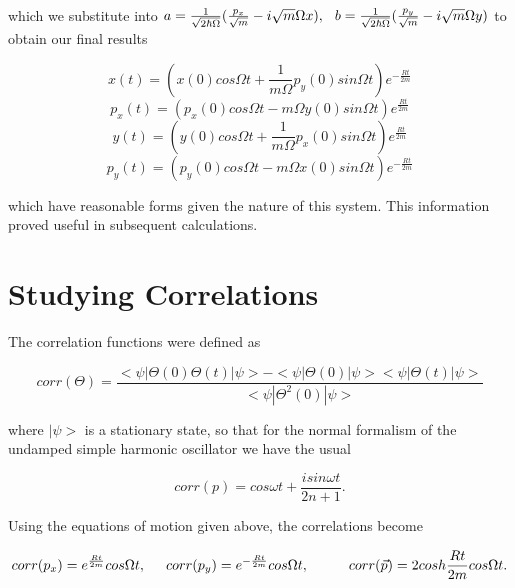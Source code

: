 which we substitute into $a = \frac{1}{\sqrt{2 \hbar \Omega}} (\frac{p_{x}}
{\sqrt{m}} - i \sqrt{m} \Omega x), \hspace{.25cm} b =  \frac{1}{\sqrt{2 \hbar
\Omega}} (\frac{p_{y}}{\sqrt{m}} - i \sqrt{m} \Omega y)$ to obtain our 
final results

\begin{equation}
x(t) = (x(0) cos\Omega t + \frac{1}{m \Omega} p_{y}(0) sin\Omega t)
        e^{- \frac{R t}{2 m}}
\end{equation}
\begin{equation}
p_{x}(t) = (p_{x}(0) cos\Omega t - m \Omega y(0) sin\Omega t)
        e^{\frac{R t}{2 m}}
\end{equation}
\begin{equation}
y(t) = (y(0) cos\Omega t + \frac{1}{m \Omega} p_{x}(0) sin\Omega t)
        e^{\frac{R t}{2 m}}
\end{equation}
\begin{equation}
p_{y}(t) = (p_{y}(0) cos\Omega t - m \Omega x(0) sin\Omega t)
        e^{- \frac{R t}{2 m}}
\end{equation}

which have reasonable forms given the nature of this system.  This information
proved useful in subsequent calculations.

\section{Studying Correlations}

The correlation functions were defined as

\begin{equation}
corr(\Theta) = \frac{<\psi | \Theta(0) \Theta(t) | \psi> - 
	<\psi | \Theta(0) | \psi><\psi | \Theta(t) | \psi>}
	{<\psi | \Theta^{2}(0) | \psi>}
\end{equation}

where $|\psi>$ is a stationary state,
so that for the normal formalism of the undamped simple harmonic oscillator
we have the usual

\begin{equation}
corr(p) = cos \omega t + \frac{i sin \omega t}{2 n + 1}.
\end{equation}

Using the equations of motion given above, the correlations become

\begin{equation}
corr(p_{x}) = e^{\frac{R t}{2 m}} cos\Omega t,
\hspace{.5cm}
corr(p_{y}) = e^{-\frac{R t}{2 m}} cos\Omega t,
\hspace{1cm}
corr(\vec{p}) = 2 cosh\frac{R t}{2 m} cos\Omega t.
\end{equation}

